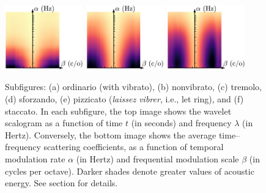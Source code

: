 \documentclass{bmcart}
\newcommand{\lnameref}[1]{%
\bgroup
\let\nmu\MakeLowercase
\nameref{#1}\egroup}
\newcommand{\nmu}{}
\begin{document}
\begin{backmatter}
\begin{figure}
\hspace{2mm}
\includegraphics[height=28mm]{Vn-sfz-C4-fp-4c_scattering.pdf}
\hspace{5mm}
\includegraphics[height=28mm]{Vn-pizz-lv-C4-pp-4c_scattering.pdf}
\hspace{5mm}
\includegraphics[trim=0 0 77 0, clip, height=28mm]{Vn-stacc-C4-mf_scattering.pdf}


\hspace{2mm}
\hspace{25mm}
\hspace{25mm}
\hspace{1mm}


\caption{
Subfigures:
(a) ordinario (with vibrato), (b) nonvibrato, (c) tremolo, (d) sforzando, (e) pizzicato (\emph{laissez vibrer}, i.e., let ring), and (f) staccato.
In each subfigure, the top image shows the wavelet scalogram as a function of time $t$ (in seconds) and frequency $\lambda$ (in Hertz).
Conversely, the bottom image shows the average time--frequency scattering coefficients, as a function of temporal modulation rate $\alpha$ (in Hertz) and frequential modulation scale $\beta$ (in cycles per octave).
Darker shades denote greater values of acoustic energy.
See \lnameref{sec:methods} section for details.}
\label{fig:violin-scattering}
\end{figure}





\end{backmatter}
\end{document}
